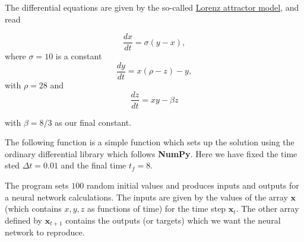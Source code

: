 \documentclass[%
oneside,                 %
final,                   %
10pt]{article}
\begin{document}
The differential equations are given by the so-called \href{{https://encyclopediaofmath.org/index.php?title=Lorenz_attractor}}{Lorenz attractor model}, and read

\[
\frac{dx}{dt}=\sigma\left(y-x\right),
\]
where $\sigma =10$ is a constant
\[
\frac{dy}{dt}= x\left(\rho-z\right)-y,
\]
with $\rho=28$ and
\[
\frac{dz}{dt}=xy-\beta z
\]

with $\beta=8/3$ as our final constant.

The following function is a
simple function which sets up the solution using the ordinary
differential library which follows \textbf{NumPy}. Here we have fixed the
time sted $\Delta t=0.01$ and the final time $t_f=8$.

The program sets $100$ random initial values and produces inputs and outputs for a neural network calculations.
The inputs are given by the values of the array $\bm{x}$ (which contains $x,y,z$ as functions of time) for the time step $\bm{x}_t$.
The other array defined by $\bm{x}_{t+1}$ contains the outputs (or targets) which we want the neural network to reproduce.
\end{document}
